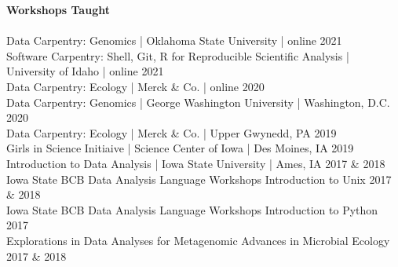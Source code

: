 \vspace{0.4cm}
{\Large \textbf{Workshops Taught}}\\[-0.4cm]
\makebox[\linewidth]{\rule{1.0\textwidth}{0.4pt}}\\
\vspace{0cm}
    Data Carpentry: Genomics | Oklahoma State University | online \hfill 2021 \\[0cm]
    Software Carpentry: Shell, Git, R for Reproducible Scientific Analysis | University of Idaho | online \hfill 2021 \\[0cm]
    Data Carpentry: Ecology | Merck \& Co. | online \hfill 2020 \\[0cm]
    Data Carpentry: Genomics | George Washington University | Washington, D.C. \hfill 2020 \\[0cm]
    Data Carpentry: Ecology | Merck \& Co. | Upper Gwynedd, PA \hfill 2019 \\[0cm]
    Girls in Science Initiaive | Science Center of Iowa | Des Moines, IA \hfill 2019 \\[0cm]
    Introduction to Data Analysis | Iowa State University | Ames, IA \hfill 2017 \& 2018 \\[0cm]
    Iowa State BCB Data Analysis Language Workshops Introduction to Unix \hfill 2017 \& 2018 \\[0cm]
    Iowa State BCB Data Analysis Language Workshops Introduction to Python \hfill 2017 \\[0cm]
    Explorations in Data Analyses for Metagenomic Advances in Microbial Ecology \hfill 2017 \& 2018 \\[0cm]
